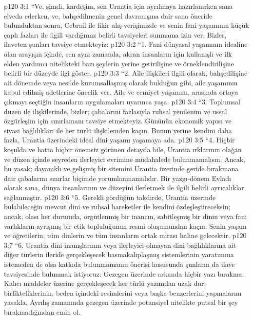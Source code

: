 \vs p120 3:1 “Ve, şimdi, kardeşim, sen Urantia için ayrılmaya hazırlanırken sana elveda ederken, ve, bahşedilmenin genel davranışına dair sana öneride bulunduktan sonra, Cebrail ile fikir alış\hyp{}verişimizde ve senin fani yaşamının küçük çaplı fazları ile ilgili vardığımız belirli tavsiyeleri sunmama izin ver. Bizler, ilaveten şunları tavsiye etmekteyiz:
\vs p120 3:2 “1. Fani dünyasal yaşamının idealine olan arayışın içinde, sen aynı zamanda, akran insanların için kullanışlı ve ilk elden yardımcı nitelikteki bazı şeylerin yerine getirilişine ve örneklendirilişine belirli bir düzeyde ilgi göster.
\vs p120 3:3 “2. Aile ilişkileri ilgili olarak, bahşedilişine ait dönemde veya nesilde kurumsallaşmış olarak bulduğun gibi, aile yaşamının kabul edilmiş adetlerine öncelik ver. Aile ve cemiyet yaşamını, arasında ortaya çıkmayı seçtiğin insanların uygulamaları uyarınca yaşa.
\vs p120 3:4 “3. Toplumsal düzen ile ilişkilerinde, bizler; çabalarını fazlasıyla ruhsal yenilenim ve ussal özgürleşim için sınırlamanı tavsiye etmekteyiz. Gününün ekonomik yapısı ve siyasi bağlılıkları ile her türlü ilişkilemden kaçın. Bunun yerine kendini daha fazla, Urantia üzerindeki ideal dini yaşamı yaşamaya ada.
\vs p120 3:5 “4. Hiçbir koşulda ve hatta hiçbir önemsiz görünen detayda bile, Urantia ırklarının olağan ve düzen içinde seyreden ilerleyici evrimine müdahalede bulunmamalısın. Ancak, bu yasak;  dayanıklı ve gelişmiş bir sitemini Urantia üzerinde geride bırakmana dair çabalarını sınırlar biçimde yorumlanmamalıdır. Bir yazgı\hyp{}dönem Evladı olarak sana, dünya insanlarının  ve  düzeyini ilerletmek ile ilgili belirli ayrıcalıklar sağlanmıştır.
\vs p120 3:6 “5. Gerekli gördüğün takdirde, Urantia üzerinde bulabileceğin mevcut dini ve ruhsal hareketler ile kendini özdeşleştireceksin; ancak, olası her durumda, örgütlenmiş bir inancın, sabitleşmiş bir dinin veya fani varlıkların ayrışmış bir etik topluluğunun resmi oluşumundan kaçın. Senin yaşam ve öğretilerin, tüm dinlerin ve tüm insanların ortak mirası haline gelecektir.
\vs p120 3:7 “6. Urantia dini inanışlarının veya ilerleyici\hyp{}olmayan dini bağlılıklarına ait diğer türlerin ileride gerçekleşecek basmakalıplaşmış sistemlerinin yaratımına istemeden de olsa katkıda bulunmamanın önerisi hususunda şunların da ilave tavsiyesinde bulunmak istiyoruz: Gezegen üzerinde arkanda hiçbir yazı bırakma. Kalıcı maddeler üzerine gerçekleşecek her türlü yazımdan uzak dur; birlikteliklerinin, beden içindeki resimlerini veya başka benzerlerini yapmalarını yasakla. Ayrılış zamanında gezegen üzerinde potansiyel nitelikte putsal bir şey bırakmadığından emin ol.
